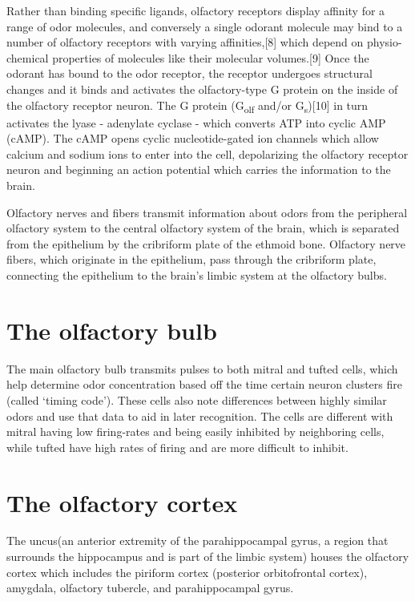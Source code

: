 Rather than binding specific ligands, olfactory receptors display affinity for a range of odor molecules, and conversely a single odorant molecule may bind to a number of olfactory receptors with varying affinities,{[}8{]} which depend on physio-chemical properties of molecules like their molecular volumes.{[}9{]} Once the odorant has bound to the odor receptor, the receptor undergoes structural changes and it binds and activates the olfactory-type G protein on the inside of the olfactory receptor neuron. The G protein (G\textsubscript{olf} and/or G\textsubscript{s}){[}10{]} in turn activates the lyase - adenylate cyclase - which converts ATP into cyclic AMP (cAMP). The cAMP opens cyclic nucleotide-gated ion channels which allow calcium and sodium ions to enter into the cell, depolarizing the olfactory receptor neuron and beginning an action potential which carries the information to the brain.

Olfactory nerves and fibers transmit information about odors from the peripheral olfactory system to the central olfactory system of the brain, which is separated from the epithelium by the cribriform plate of the ethmoid bone. Olfactory nerve fibers, which originate in the epithelium, pass through the cribriform plate, connecting the epithelium to the brain's limbic system at the olfactory bulbs.

\hypertarget{the-olfactory-bulb}{%
\section{The olfactory bulb}\label{the-olfactory-bulb}}

The main olfactory bulb transmits pulses to both mitral and tufted cells, which help determine odor concentration based off the time certain neuron clusters fire (called `timing code'). These cells also note differences between highly similar odors and use that data to aid in later recognition. The cells are different with mitral having low firing-rates and being easily inhibited by neighboring cells, while tufted have high rates of firing and are more difficult to inhibit.

\hypertarget{the-olfactory-cortex}{%
\section{The olfactory cortex}\label{the-olfactory-cortex}}

The uncus(an anterior extremity of the parahippocampal gyrus, a region that surrounds the hippocampus and is part of the limbic system) houses the olfactory cortex which includes the piriform cortex (posterior orbitofrontal cortex), amygdala, olfactory tubercle, and parahippocampal gyrus.

